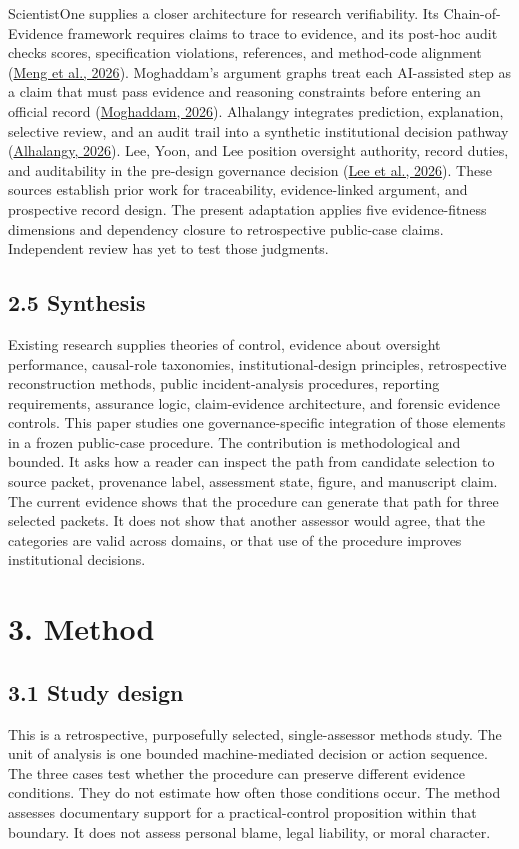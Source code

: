 \documentclass[11pt]{article}
\begin{document}
ScientistOne supplies a closer architecture for research verifiability. Its Chain-of-Evidence framework requires claims to trace to evidence, and its post-hoc audit checks scores, specification violations, references, and method-code alignment (\href{https://doi.org/10.48550/arXiv.2605.26340}{Meng et al., 2026}). Moghaddam's argument graphs treat each AI-assisted step as a claim that must pass evidence and reasoning constraints before entering an official record (\href{https://doi.org/10.48550/arXiv.2604.04103}{Moghaddam, 2026}). Alhalangy integrates prediction, explanation, selective review, and an audit trail into a synthetic institutional decision pathway (\href{https://doi.org/10.3390/info17070694}{Alhalangy, 2026}). Lee, Yoon, and Lee position oversight authority, record duties, and auditability in the pre-design governance decision (\href{https://doi.org/10.3390/systems14070849}{Lee et al., 2026}). These sources establish prior work for traceability, evidence-linked argument, and prospective record design. The present adaptation applies five evidence-fitness dimensions and dependency closure to retrospective public-case claims. Independent review has yet to test those judgments.
\subsection*{2.5 Synthesis}
Existing research supplies theories of control, evidence about oversight performance, causal-role taxonomies, institutional-design principles, retrospective reconstruction methods, public incident-analysis procedures, reporting requirements, assurance logic, claim-evidence architecture, and forensic evidence controls. This paper studies one governance-specific integration of those elements in a frozen public-case procedure.
The contribution is methodological and bounded. It asks how a reader can inspect the path from candidate selection to source packet, provenance label, assessment state, figure, and manuscript claim. The current evidence shows that the procedure can generate that path for three selected packets. It does not show that another assessor would agree, that the categories are valid across domains, or that use of the procedure improves institutional decisions.
\FloatBarrier
\section*{3. Method}
\subsection*{3.1 Study design}
This is a retrospective, purposefully selected, single-assessor methods study. The unit of analysis is one bounded machine-mediated decision or action sequence. The three cases test whether the procedure can preserve different evidence conditions. They do not estimate how often those conditions occur. The method assesses documentary support for a practical-control proposition within that boundary. It does not assess personal blame, legal liability, or moral character.
\end{document}
